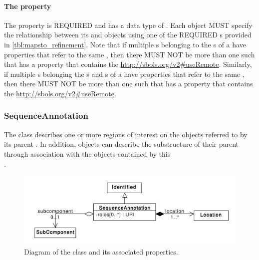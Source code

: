 \paragraph{The  property}\label{sec:refinement}
The  property is REQUIRED and has a data type of . Each  object MUST specify the relationship between its  and   objects using one of the REQUIRED  s provided in \ref{tbl:mapsto_refinement}.
Note that if multiple s belonging to the s of a  have  properties that refer to the same , then there MUST NOT be more than one such  that has a  property that contains the  \url{http://sbols.org/v2\#useRemote}. Similarly, if multiple s belonging the s and s of a  have  properties that refer to the same , then there MUST NOT be more than one such  that has a  property that contains the  \url{http://sbols.org/v2\#useRemote}.


\subsubsection{SequenceAnnotation}
\label{sec:SequenceAnnotation}
The  class describes one or more regions of interest on the  objects referred to by its parent . In addition,  objects can describe the substructure of their parent  through association with the  objects contained by this\\
.

\begin{figure}[ht]
\begin{center}
\includegraphics[scale=0.6]{uml/sequence_annotation}
\caption[]{Diagram of the  class and its associated properties.}
\label{uml:sequence_annotation}
\end{center}
\end{figure}


